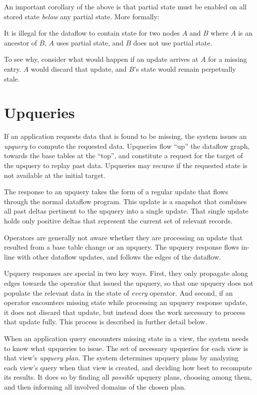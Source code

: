 An important corollary of the above is that partial state must be enabled
on all stored state \emph{below} any partial state. More formally:

\begin{invariant}
  \label{i:partial-above-full}
  It is illegal for the dataflow to contain state for two nodes $A$ and $B$
  where $A$ is an ancestor of $B$, $A$ uses partial state, and $B$ does not use
  partial state.
\end{invariant}

To see why, consider what would happen if an update arrives at $A$ for a missing
entry. $A$ would discard that update, and $B$'s state would remain perpetually
stale.

\section{Upqueries}
\label{s:upqueries}

If an application requests data that is found to be missing, the system issues
an \textit{upquery} to compute the requested data. Upqueries flow ``up'' the
dataflow graph, towards the base tables at the ``top'', and constitute a request
for the target of the upquery to replay past data. Upqueries may recurse if the
requested state is not available at the initial target.

The response to an upquery takes the form of a regular update that flows through
the normal dataflow program. This update is a snapshot that combines all past
deltas pertinent to the upquery into a single update. That single update holds
only positive deltas that represent the current set of relevant records.

Operators are generally not aware whether they are processing an update that
resulted from a base table change or an upquery. The upquery response flows
in-line with other dataflow updates, and follows the edges of the dataflow.

Upquery responses are special in two key ways. First, they only propagate along
edges towards the operator that issued the upquery, so that one upquery does not
populate the relevant data in the state of \emph{every} operator. And second,
if an operator encounters missing state while processing an upquery response
update, it does not discard that update, but instead does the work necessary to
process that update fully. This process is described in further detail below.

When an application query encounters missing state in a view, the system needs
to know what upqueries to issue. The set of necessary upqueries for each view is
that view's \textit{upquery plan}. The system determines upquery plans by
analyzing each view's query when that view is created, and deciding how best
to recompute its results. It does so by finding all \emph{possible} upquery
plans, choosing among them, and then informing all involved domains of the
chosen plan.

